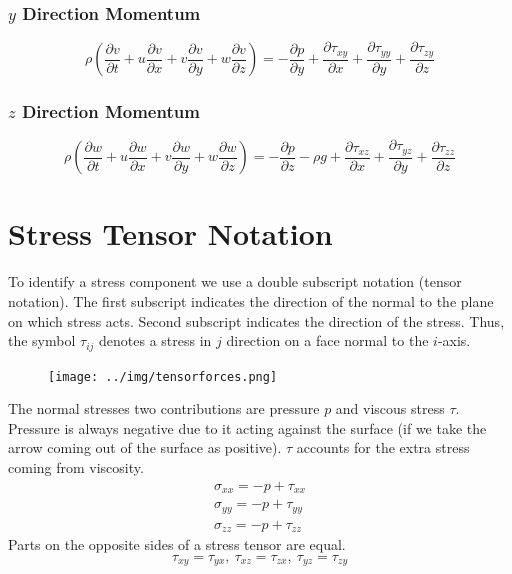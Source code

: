 \documentclass[class=report, crop=false, 12pt,a4paper]{standalone}
\begin{document}
\subsubsection{$y$ Direction Momentum}
\begin{equation}
  \rho \left( \frac{\partial v}{\partial t} + u \frac{\partial v}{\partial x} + v \frac{\partial v}{\partial y} + w \frac{\partial v}{\partial z} \right) = -\frac{\partial p}{\partial y} + \frac{\partial \tau_{xy}}{\partial x} + \frac{\partial \tau_{yy}}{\partial y} + \frac{\partial \tau_{zy}}{\partial z}
\end{equation}
\subsubsection{$z$ Direction Momentum}
\begin{equation}
  \rho \left( \frac{\partial w}{\partial t} + u \frac{\partial w}{\partial x} + v \frac{\partial w}{\partial y} + w \frac{\partial w}{\partial z} \right) = -\frac{\partial p}{\partial z} -\rho g + \frac{\partial \tau_{xz}}{\partial x} + \frac{\partial \tau_{yz}}{\partial y} + \frac{\partial \tau_{zz}}{\partial z}
\end{equation}
\section{Stress Tensor Notation}
To identify a stress component we use a double subscript notation (tensor notation). The first subscript indicates the direction of the normal to the plane on which stress acts. Second subscript indicates the direction of the stress. Thus, the symbol $\tau_{ij}$ denotes a stress in $j$ direction on a face normal to the $i$-axis.
\begin{figure}[H]
  \centering
  \texttt{[image: ../img/tensorforces.png]}
\end{figure}
The normal stresses two contributions are pressure $p$ and viscous stress $\tau$. Pressure is always negative due to it acting against the surface (if we take the arrow coming out of the surface as positive). $\tau$ accounts for the extra stress coming from viscosity.
\begin{gather}
  \sigma_{xx} = -p + \tau_{xx}\\
  \sigma_{yy} = -p + \tau_{yy}\\
  \sigma_{zz} = -p + \tau_{zz}
\end{gather}
Parts on the opposite sides of a stress tensor are equal.
$$ \tau_{xy} = \tau_{yx}, \ \tau_{xz} = \tau_{zx}, \ \tau_{yz} = \tau_{zy} $$
\end{document}
